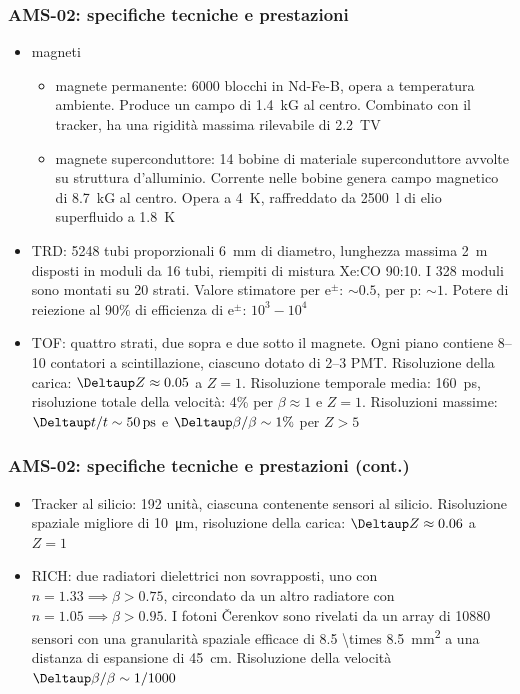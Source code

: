 \documentclass[10pt]{beamer}
\begin{document}
\begin{frame}
  \frametitle{AMS-02: specifiche tecniche e prestazioni}
  \begin{itemize}
  \item magneti
    \begin{itemize}
    \item magnete permanente: 6000 blocchi in Nd-Fe-B, opera a temperatura
      ambiente.  Produce un campo di \SI{1.4}{\kilo G} al centro.  Combinato con
      il tracker, ha una rigidità massima rilevabile di \SI{2.2}{\tera\volt}
    \item magnete superconduttore: 14 bobine di materiale superconduttore
      avvolte su struttura d'alluminio.  Corrente nelle bobine genera campo
      magnetico di \SI{8.7}{\kilo G} al centro.  Opera a \SI{4}{\kelvin},
      raffreddato da \SI{2500}{\litre} di elio superfluido a \SI{1.8}{\kelvin}
    \end{itemize}
  \item TRD: 5248 tubi proporzionali \SI{6}{\milli\metre} di diametro, lunghezza
    massima \SI{2}{\metre} disposti in moduli da 16 tubi, riempiti di mistura
    Xe:CO 90:10.  I 328 moduli sono montati su 20 strati.  Valore
    stimatore per e$^{\pm}$: $\sim 0.5$, per p: $\sim 1$.  Potere di reiezione
    al 90\% di efficienza di e$^{\pm}$: $10^{3}-10^{4}$
  \item TOF: quattro strati, due sopra e due sotto il magnete.  Ogni piano
    contiene 8--10 contatori a scintillazione, ciascuno dotato di 2--3 PMT.
    Risoluzione della carica: $\Deltaup Z \approx 0.05$ a $Z = 1$.  Risoluzione
    temporale media: \SI{160}{\pico\second}, risoluzione totale della velocità:
    4\% per $\beta \approx 1$ e $Z = 1$.  Risoluzioni massime:
    $\Deltaup t/t \sim \SI{50}{\pico\second}$ e $\Deltaup \beta/\beta \sim 1\%$
    per $Z > 5$
  \end{itemize}
\end{frame}

\begin{frame}
  \frametitle{AMS-02: specifiche tecniche e prestazioni (cont.)}
  \begin{itemize}
  \item Tracker al silicio: 192 unità, ciascuna contenente sensori al
    silicio.  Risoluzione spaziale migliore di \SI{10}{\micro\metre},
    risoluzione della carica: $\Deltaup Z \approx 0.06$ a $Z = 1$
  \item RICH: due radiatori dielettrici non sovrapposti, uno con
    $n = 1.33 \implies \beta > 0.75$, circondato da un altro radiatore con
    $n = 1.05 \implies \beta > 0.95$.  I fotoni Čerenkov sono rivelati da un
    array di \num{10880} sensori con una granularità spaziale efficace di
    \SI[parse-numbers=false]{8.5 \times 8.5}{\milli\metre\squared} a una
    distanza di espansione di \SI{45}{\centi\metre}.  Risoluzione della velocità
    $\Deltaup \beta/\beta \sim 1/1000$
  \end{itemize}
\end{frame}
\end{document}
